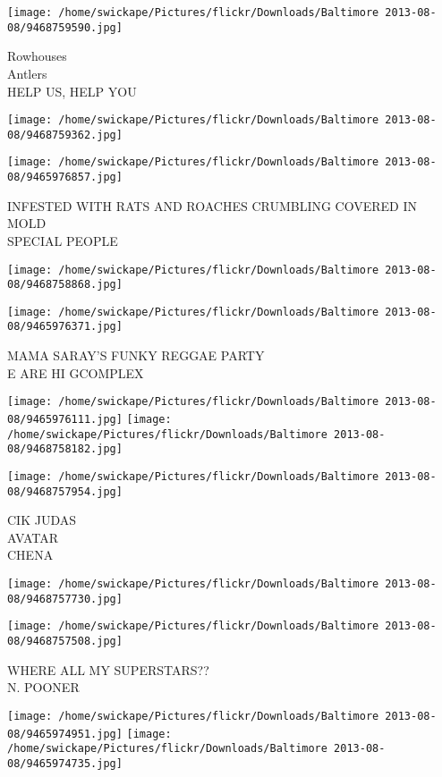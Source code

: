 \documentclass[10pt,letterpaper]{article}
\begin{document}
\vspace{0.25in}
\texttt{[image: /home/swickape/Pictures/flickr/Downloads/Baltimore 2013-08-08/9468759590.jpg]}

Rowhouses\\
Antlers\\
HELP US, HELP YOU
\pagebreak

\texttt{[image: /home/swickape/Pictures/flickr/Downloads/Baltimore 2013-08-08/9468759362.jpg]}

\vspace{0.25in}
\texttt{[image: /home/swickape/Pictures/flickr/Downloads/Baltimore 2013-08-08/9465976857.jpg]}

INFESTED WITH RATS AND ROACHES CRUMBLING COVERED IN MOLD\\
SPECIAL PEOPLE
\pagebreak

\texttt{[image: /home/swickape/Pictures/flickr/Downloads/Baltimore 2013-08-08/9468758868.jpg]}

\vspace{0.25in}
\texttt{[image: /home/swickape/Pictures/flickr/Downloads/Baltimore 2013-08-08/9465976371.jpg]}

MAMA SARAY'S FUNKY REGGAE PARTY\\
E ARE HI GCOMPLEX
\pagebreak

\texttt{[image: /home/swickape/Pictures/flickr/Downloads/Baltimore 2013-08-08/9465976111.jpg]}
\texttt{[image: /home/swickape/Pictures/flickr/Downloads/Baltimore 2013-08-08/9468758182.jpg]}

\vspace{0.25in}
\texttt{[image: /home/swickape/Pictures/flickr/Downloads/Baltimore 2013-08-08/9468757954.jpg]}

CIK JUDAS\\
AVATAR\\
CHENA
\pagebreak

\texttt{[image: /home/swickape/Pictures/flickr/Downloads/Baltimore 2013-08-08/9468757730.jpg]}

\vspace{0.25in}
\texttt{[image: /home/swickape/Pictures/flickr/Downloads/Baltimore 2013-08-08/9468757508.jpg]}

WHERE ALL MY SUPERSTARS??\\
N. POONER
\pagebreak

\texttt{[image: /home/swickape/Pictures/flickr/Downloads/Baltimore 2013-08-08/9465974951.jpg]}
\texttt{[image: /home/swickape/Pictures/flickr/Downloads/Baltimore 2013-08-08/9465974735.jpg]}
\end{document}

